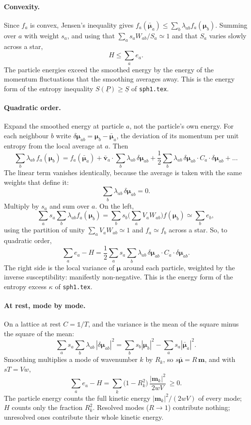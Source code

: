\documentclass[11pt,aps,preprint,nofootinbib,superscriptaddress,tightenlines]{revtex4-2}
\def\st{\begin{equation}}
\def\stp{\end{equation}}
\newcommand{\one}{\mathds{1}}
\let\oldparagraph\paragraph
\renewcommand{\paragraph}{\par\bigskip\oldparagraph}
\begin{document}
\paragraph{Convexity.}  Since $f_a$ is convex, Jensen's inequality gives
$f_a(\bar{\bm\mu}_a)\le\sum_b\lambda_{ab}f_a(\bm\mu_b)$.  Summing over $a$ with
weight $s_a$, and using that $\sum_as_aW_{ab}/S_a\simeq1$ and that $S_a$ varies
slowly across a star,
\st
H\le\sum_ae_a .
\stp
The particle energies exceed the smoothed energy by the energy of the momentum
fluctuations that the smoothing averages away.  This is the energy form of the
entropy inequality $S(\underline P)\ge\underline S$ of \texttt{sph1.tex}.

\paragraph{Quadratic order.}  Expand the smoothed energy at particle $a$, not
the particle's own energy.  For each neighbour $b$ write
$\delta\bm\mu_{ab}=\bm\mu_b-\bar{\bm\mu}_a$, the deviation of its momentum per
unit entropy from the local average at $a$.  Then
\st
\sum_b\lambda_{ab}\,f_a(\bm\mu_b)
=f_a(\bar{\bm\mu}_a)+\bar{\bm v}_a\cdot\sum_b\lambda_{ab}\,\delta\bm\mu_{ab}
+\frac12\sum_b\lambda_{ab}\,\delta\bm\mu_{ab}\cdot C_a\cdot\delta\bm\mu_{ab}+\dots
\stp
The linear term vanishes identically, because the average is taken with the
same weights that define it:
\st
\sum_b\lambda_{ab}\,\delta\bm\mu_{ab}=0 .
\stp
Multiply by $s_a$ and sum over $a$.  On the left,
\st
\sum_as_a\sum_b\lambda_{ab}f_a(\bm\mu_b)
=\sum_bs_b\Big(\sum_aV_aW_{ab}\Big)f(\bm\mu_b)\simeq\sum_be_b ,
\stp
using the partition of unity $\sum_aV_aW_{ab}\simeq1$ and $f_a\simeq f_b$ across
a star.  So, to quadratic order,
\st
\boxed{\;\sum_ae_a-H=\frac12\sum_as_a\sum_b\lambda_{ab}\,
\delta\bm\mu_{ab}\cdot C_a\cdot\delta\bm\mu_{ab} .\;}
\label{excess}
\stp
The right side is the local variance of $\bm\mu$ around each particle, weighted
by the inverse susceptibility: manifestly non-negative.  This is the energy form
of the entropy excess $\kappa$ of \texttt{sph1.tex}.

\paragraph{At rest, mode by mode.}  On a lattice at rest $C=\one/T$, and the
variance is the mean of the square minus the square of the mean:
\st
\sum_as_a\sum_b\lambda_{ab}\,|\delta\bm\mu_{ab}|^2
=\sum_bs_b|\bm\mu_b|^2-\sum_as_a|\bar{\bm\mu}_a|^2 .
\stp
Smoothing multiplies a mode of wavenumber $k$ by $R_k$, so $s\bar{\bm\mu}=R\,\bm m$,
and with $sT=Vw$,
\st
\sum_ae_a-H=\sum_k\big(1-R_k^2\big)\,\frac{|\bm m_k|^2}{2wV}\ \ge0 .
\label{excessk}
\stp
The particle energy counts the full kinetic energy $|\bm m_k|^2/(2wV)$ of every
mode; $H$ counts only the fraction $R_k^2$.  Resolved modes ($R\to1$) contribute
nothing; unresolved ones contribute their whole kinetic energy.
\end{document}

